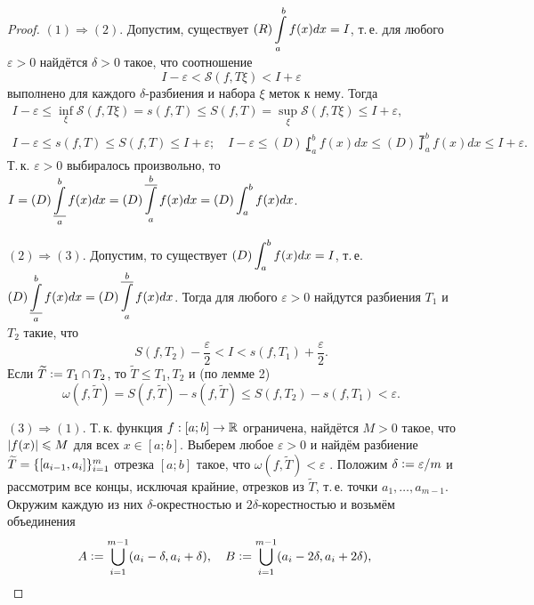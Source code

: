 \begin{proof}
    $(1) \Rightarrow (2)$. Допустим, существует $\displaystyle (R)\int\limits_a^bf(x)dx = I$, т.\,е. для любого $\varepsilon > 0$ найдётся $\delta > 0$ такое, что соотношение
    \[
        I - \varepsilon < \mathcal{S}(f, T\xi) < I + \varepsilon
    \]
    выполнено для каждого $\delta$-разбиения и набора $\xi$ меток к нему. Тогда
    \begin{gather*}
        I - \varepsilon \leqslant \inf\limits_\xi\mathcal{S}(f, T\xi) = s(f, T) \leqslant S(f, T) = \sup\limits_\xi\mathcal{S}(f, T\xi) \leqslant I + \varepsilon,\\
        I - \varepsilon \leqslant s(f, T) \leqslant S(f, T) \leqslant I + \varepsilon;\quad
        I - \varepsilon \leqslant (D)\lowint_a^bf(x)dx \leqslant (D)\upint_a^bf(x)dx \leqslant I + \varepsilon.
    \end{gather*}
    Т.\,к. $\varepsilon > 0$ выбиралось произвольно, то $\displaystyle I = (D)\operatorname*{\underline{\int}}_a^bf(x)dx = (D)\operatorname*{\overline{\int}}_a^bf(x)dx = (D)\int_a^bf(x)dx$.

    $(2) \Rightarrow (3)$. Допустим, то существует $\displaystyle (D)\int_a^bf(x)dx = I$, т.\,е. $\displaystyle (D)\operatorname*{\underline{\int}}_a^bf(x)dx = (D)\operatorname*{\overline{\int}}_a^bf(x)dx$. Тогда для любого $\varepsilon > 0$ найдутся разбиения $T_1$ и $T_2$ такие, что
    \[
        S(f, T_2) - \frac{\varepsilon}{2} < I < s(f, T_1) + \frac{\varepsilon}{2}.
    \]
    Если $\widetilde{T} \vcentcolon = T_1 \cap T_2$, то $\widetilde{T} \leqslant T_1, T_2$ и (по лемме 2)
    \[
        \omega(f, \widetilde{T}) = S(f, \widetilde{T}) - s(f, \widetilde{T}) \leqslant S(f, T_2) - s(f, T_1) < \varepsilon.
    \]

    $(3) \Rightarrow (1)$. Т.\,к. функция $f: [a; b] \to \mathbb{R}$ ограничена, найдётся $M > 0$ такое, что $\left\lvert f(x)\right\rvert \leqslant M$ для всех $x \in [a; b]$. Выберем любое $\varepsilon > 0$ и найдём разбиение $\widetilde{T} = \{\left[a_{i - 1}, a_i\right]\}_{i = 1}^m$ отрезка $[a; b]$ такое, что $\omega(f, \widetilde{T}) < \varepsilon$ . Положим $\delta \vcentcolon = \varepsilon / m$ и рассмотрим все концы, исключая крайние, отрезков из $\widetilde{T}$, т.\,е. точки $a_1, \ldots, a_{m - 1}$. Окружим каждую из них $\delta$-окрестностью и $2\delta$-корестностью и возьмём объединения
    \[
        A \vcentcolon = \bigcup_{i = 1}^{m - 1}(a_i - \delta, a_i + \delta),\quad
        B \vcentcolon = \bigcup_{i = 1}^{m - 1}(a_i - 2\delta, a_i + 2\delta),\quad
    \]


\end{proof}
